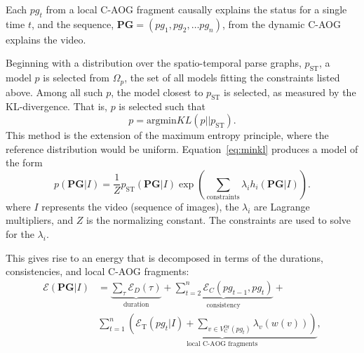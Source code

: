 \documentclass[10pt,journal,letterpaper,compsoc]{IEEEtran}
\begin{document}








Each $pg_t$ from a local C-AOG fragment causally explains the status for a single time $t$, and the sequence, $\mathbf{PG} = (pg_1, pg_2, \ldots pg_n)$, from the dynamic C-AOG explains the video.  


Beginning with a distribution over the spatio-temporal parse graphs, $p_{\textrm{ST}}$, a model $p$ is selected from $\Omega_p$, the set of all models fitting the constraints listed above.  Among all such $p$, the model closest to $p_{\textrm{ST}}$ is selected, as measured by the KL-divergence.  That is, $p$ is selected such that 
\begin{equation}
p = \textrm{argmin} KL(p || p_{\textrm{ST}}). \label{eq:minkl}
\end{equation}
This method is the extension of the maximum entropy principle, where the reference distribution would be uniform.  Equation~\ref{eq:minkl} produces a model of the form 
\begin{equation}
p(\mathbf{PG} | I) = \frac{1}{Z} p_{\textrm{ST}} (\mathbf{PG} | I) \exp \left( \sum_{\textrm{constraints} } \lambda_i h_i(\mathbf{PG} | I) \right).
\end{equation}
where $I$ represents the video (sequence of images), the $\lambda_i$ are Lagrange multipliers, and $Z$ is the normalizing constant.  The constraints are used to solve for the $\lambda_i$.  


This gives rise to an energy that is decomposed in terms of the durations, consistencies, and local C-AOG fragments:
\begin{equation}
\begin{split}
\mathcal{E}(\mathbf{PG}|I)  & = \underbrace{\sum_{\tau} \mathcal{E}_D(\tau)}_{\textrm{duration}} + \underbrace{\sum_{t = 2}^n \mathcal{E}_C(pg_{t-1} , pg_{t})}_{\textrm{consistency}} + \\ 
& \sum_{t=1}^n  \underbrace{ \left(\mathcal{E}_{\mathrm{T}}(pg_t|I) + \sum_{v \in V_{\mathrm{C}}^{\mathrm{Or}}(pg_t)} \lambda_v(w(v))\right) }_{\textrm{local C-AOG fragments}} ,
\label{eq:dynamicenergy}
\end{split}
\end{equation}
\end{document}
